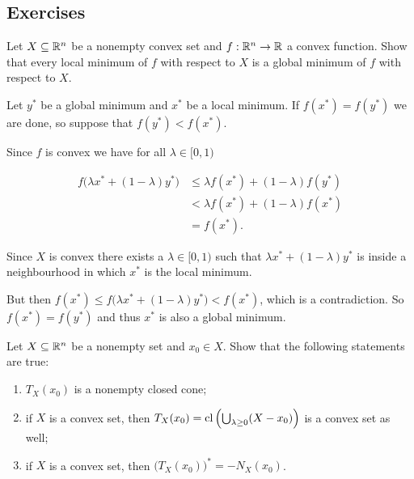 \subsection{Exercises}

\begin{problem}

Let \(X \subseteq \mathbb{R}^n\) be a nonempty convex set and \(f : \mathbb{R}^n \to \mathbb{R}\) a convex function. Show that every local minimum of \(f\) with respect to \(X\) is a global minimum of \(f\) with respect to \(X\).

\end{problem}

\begin{solution}

Let \(y^*\) be a global minimum and \(x^*\) be a local minimum. If \(f(x^*) = f(y^*)\) we are done, so suppose that \(f(y^*) < f(x^*)\).

Since \(f\) is convex we have for all \(\lambda \in [0, 1)\)

\begin{align*}
    f \big( \lambda x^* + (1-\lambda) y^* \big) &\le \lambda f(x^*) + (1-\lambda) f(y^*) \\
    &< \lambda f(x^*) + (1-\lambda) f(x^*) \\
    &= f(x^*).
\end{align*}

Since \(X\) is convex there exists a \(\lambda \in [0,1)\) such that \(\lambda x^* + (1-\lambda) y^*\) is inside a neighbourhood in which \(x^*\) is the local minimum.

But then \(f(x^*) \le f \big( \lambda x^* + (1-\lambda) y^* \big) < f(x^*)\), which is a contradiction. So \(f(x^*) = f(y^*)\) and thus \(x^*\) is also a global minimum.

\end{solution}

\begin{problem}

Let \(X \subseteq \mathbb{R}^n\) be a nonempty set and \(x_0 \in X\). Show that the following statements are true:

\begin{enumerate}
    \item \(T_X(x_0)\) is a nonempty closed cone;
    \item if \(X\) is a convex set, then \(T_X(x_0) = \operatorname{cl}\left(\bigcup_{\lambda \ge 0}(X - x_0)\right)\) is a convex set as well;
    \item if \(X\) is a convex set, then \(\big(T_X(x_0)\big)^* = - N_X(x_0)\).
\end{enumerate}

\end{problem}

